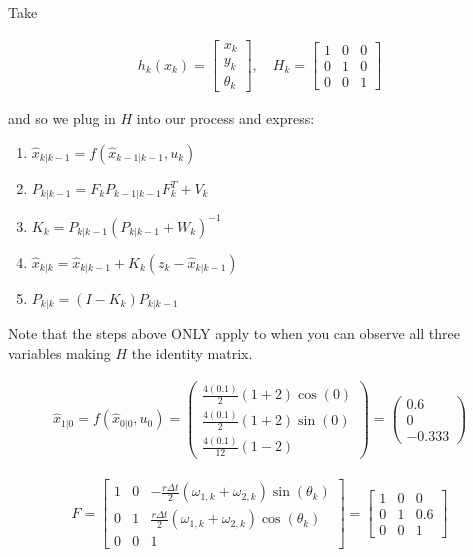 Take

\[\begin{aligned}
h_k(x_k) = \begin{bmatrix} x_k \\ y_k \\ \theta_k \end{bmatrix}, \quad
H_k = \begin{bmatrix} 1 & 0  & 0  \\
0 & 1  & 0  \\
0 & 0  & 1  \end{bmatrix}
\end{aligned}\]

and so we plug in \(H\) into our process and express:

\begin{enumerate}
\tightlist
\item
  \(\hat{x}_{k|k-1} = f(\hat{x}_{k-1|k-1}, u_{k})\)
\item
  \(P_{k|k-1} = F_{k} P_{k-1|k-1} F_{k}^{T} + V_{k}\)
\item
  \(K_k = P_{k|k-1}\left(
  P_{k|k-1} + W_k\right)^{-1}\)
\item
  \(\hat{x}_{k|k} =\hat{x}_{k|k-1} + K_k \left(z_k - \hat{x}_{k|k-1}\right)\)
\item
  \(P_{k|k} =   (I - K_k ) P_{k|k-1}\)
\end{enumerate}

Note that the steps above ONLY apply to when you can observe all three
variables making \(H\) the identity matrix.

\[\begin{aligned}
\hat{x}_{1|0} = f(\hat{x}_{0|0}, u_{0}) =
\begin{pmatrix}
 \frac{4(0.1)}{2} (1+2)\cos(0) \\[5mm]
 \frac{4(0.1)}{2} (1+2)\sin(0) \\[5mm]
 \frac{4(0.1)}{12} (1-2)
\end{pmatrix}
=
\begin{pmatrix}
 0.6 \\[5mm]
 0 \\[5mm]
-0.333
\end{pmatrix}
\end{aligned}\]

\[\begin{aligned}
F = \begin{bmatrix} 1 & 0  &
-\frac{r\Delta t}{2} (\omega_{1, k}+\omega_{2, k})\sin(\theta_k)  \\[8pt]
0 & 1  &
\frac{r\Delta t}{2} (\omega_{1, k}+\omega_{2, k})\cos(\theta_k)  \\[8pt]
0 & 0  & 1  \end{bmatrix} =
\begin{bmatrix} 1 & 0  &
0  \\
0 & 1  &
0.6  \\
0 & 0  & 1  \end{bmatrix}
\end{aligned}\]

